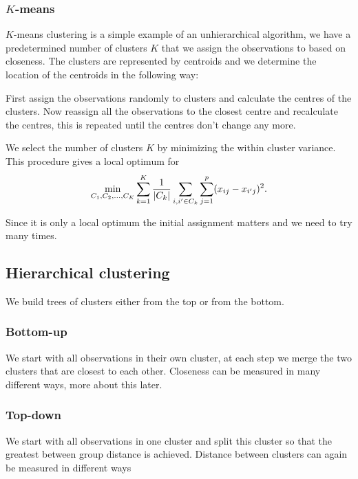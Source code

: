 \documentclass[a4paper, 12pt]{scrartcl}
\begin{document}
\subsubsection*{$K$-means}
$K$-means clustering is a simple example of an unhierarchical algorithm, we have a predetermined number of clusters $K$ that we assign the observations to based on closeness.
The clusters are represented by centroids and we determine the location of the centroids in the following way:
\begin{algorithm}
	First assign the observations randomly to clusters and calculate the centres of the clusters.
	Now reassign all the observations to the closest centre and recalculate the centres, this is repeated until the centres don't change any more.
	
	We select the number of clusters $K$ by minimizing the within cluster variance.
	This procedure gives a local optimum for
	\begin{equation*}
		\operatornamewithlimits{min}_{C_1,C_2,\dots,C_K}\sum_{k=1}^{K}\frac{1}{|C_k|}\sum_{i, i'\in C_k}\sum_{j=1}^{p}(x_{ij}-x_{i'j})^2.
	\end{equation*}
\end{algorithm}

Since it is only a local optimum the initial assignment matters and we need to try many times.

\subsection{Hierarchical clustering}
We build trees of clusters either from the top or from the bottom.

\subsubsection*{Bottom-up}
\begin{algorithm}
We start with all observations in their own cluster, at each step we merge the two clusters that are closest to each other.
Closeness can be measured in many different ways, more about this later.
\end{algorithm}

\subsubsection*{Top-down}
\begin{algorithm}
We start with all observations in one cluster and split this cluster so that the greatest between group distance is achieved.
Distance between clusters can again be measured in different ways
\end{algorithm}
\end{document}
